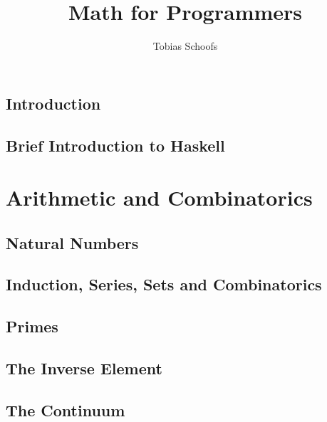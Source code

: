 \documentclass{scrbook}
\begin{document}
\setlength{\parindent}{0pt}
\setlength{\parskip}{8pt}

\title {Math for Programmers}
\author {Tobias Schoofs}
\maketitle
\tableofcontents

\chapter{Introduction} %

\chapter{Brief Introduction to Haskell} %

\part{Arithmetic and Combinatorics}

\chapter{Natural Numbers} %

\chapter{Induction, Series, Sets and Combinatorics}\label{chap:series} %

\chapter{Primes} %

\chapter{The Inverse Element} %

\chapter{The Continuum} %
\end{document}
